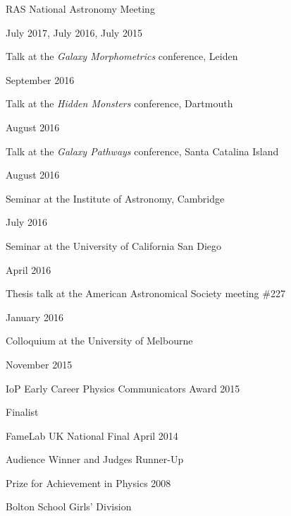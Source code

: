\documentclass{article}
\begin{document}
\noindent\makebox[\linewidth]{\rule{0.85\paperwidth}{0.2pt}}
\smallskip

\smallskip

\noindent\makebox[\linewidth]{\rule{0.85\paperwidth}{0.2pt}}

\smallskip

\indent RAS National Astronomy Meeting

\indent \indent July 2017, July 2016, July 2015

\smallskip

\indent Talk at the \emph{Galaxy Morphometrics} conference, Leiden

\indent \indent September 2016
\smallskip

\indent Talk at the \emph{Hidden Monsters} conference, Dartmouth

\indent \indent August 2016
\smallskip

\indent Talk at the \emph{Galaxy Pathways} conference, Santa Catalina Island 

\indent \indent August 2016
\smallskip

\indent Seminar at the Institute of Astronomy, Cambridge

\indent \indent July 2016
\smallskip

\indent Seminar at the University of California San Diego

\indent \indent April 2016
\smallskip

\indent Thesis talk at the American Astronomical Society meeting \#227 

\indent \indent January 2016
\smallskip

\indent Colloquium at the University of Melbourne

\indent \indent November 2015
\smallskip

\noindent\makebox[\linewidth]{\rule{0.85\paperwidth}{0.2pt}}

\smallskip

\indent IoP Early Career Physics Communicators Award 2015

\indent \indent Finalist

\smallskip

\indent FameLab UK National Final April 2014

\indent \indent Audience Winner and Judges Runner-Up
\smallskip

\indent Prize for Achievement in Physics 2008

\indent \indent Bolton School Girls' Division
\end{document}
